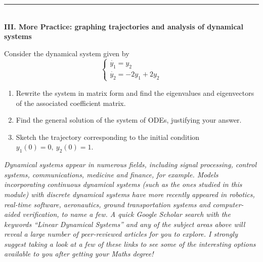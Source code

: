 \documentclass[11pt,a4paper]{article}
\begin{document}
	\rule{\textwidth}{0.4pt}\\
	\textbf{III. More Practice: graphing trajectories and analysis of dynamical systems}\par
	Consider the dynamical system given by
	$$
	\begin{cases}
		\dot{y_1} = y_2\\
		\dot{y_2} = -2y_1 + 2y_2
	\end{cases}
	$$
	\begin{enumerate}
		\item Rewrite the system in matrix form and find the eigenvalues and eigenvectors of the associated coefficient matrix.
		\item Find the general solution of the system of ODEs, justifying your answer.
		\item Sketch the trajectory corresponding to the initial condition $y_1(0) = 0,\ y_2(0) = 1$.
	\end{enumerate}
	\vspace{2cm}
	\textit{Dynamical systems appear in numerous fields, including signal processing, control systems, communications, medicine and finance, for example. Models incorporating continuous dynamical systems (such as the ones studied in this module) with discrete dynamical systems have more recently appeared in robotics, real-time software, aeronautics, ground transportation systems and computer-aided verification, to name a few. A quick Google Scholar search with the keywords “Linear Dynamical Systems” and any of the subject areas above will reveal a large number of peer-reviewed articles for you to explore. I strongly suggest taking a look at a few of these links to see some of the interesting options available to you after getting your Maths degree!}
\end{document}

